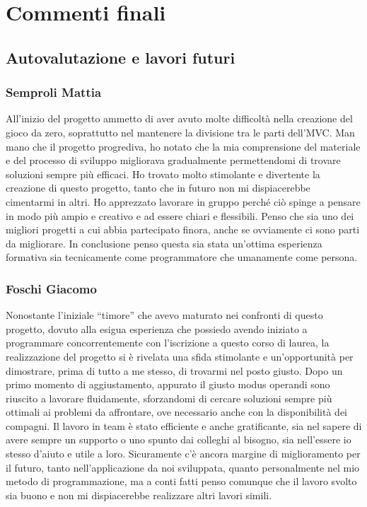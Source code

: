 \documentclass[a4paper,12pt]{report}
\begin{document}
\chapter{Commenti finali}

\section{Autovalutazione e lavori futuri}

\subsection*{Semproli Mattia}
All’inizio del progetto ammetto di aver avuto molte difficoltà nella creazione del gioco da zero, soprattutto nel mantenere la divisione tra le parti dell'MVC. Man mano che il progetto progrediva, ho notato che la mia comprensione del materiale e del processo di sviluppo migliorava gradualmente permettendomi di trovare soluzioni sempre più efficaci. Ho trovato molto stimolante e divertente la creazione di questo progetto, tanto che in futuro non mi dispiacerebbe cimentarmi in altri. Ho apprezzato lavorare in gruppo perché ciò spinge a pensare in modo più ampio e creativo e ad essere chiari e flessibili. Penso che sia uno dei migliori progetti a cui abbia partecipato finora, anche se ovviamente ci sono parti da migliorare. In conclusione penso questa sia stata un’ottima esperienza formativa sia tecnicamente come programmatore che umanamente come persona.

\subsection*{Foschi Giacomo}
Nonostante l’iniziale “timore” che avevo maturato nei confronti di questo progetto, dovuto alla esigua esperienza che possiedo avendo iniziato a programmare concorrentemente con l’iscrizione a questo corso di laurea, la realizzazione del progetto si è rivelata una sfida stimolante e un’opportunità per dimostrare, prima di tutto a me stesso, di trovarmi nel posto giusto. Dopo un primo momento di aggiustamento, appurato il giusto modus operandi sono riuscito a lavorare fluidamente, sforzandomi di cercare soluzioni sempre più ottimali ai problemi da affrontare, ove necessario anche con la disponibilità dei compagni. Il lavoro in team è stato efficiente e anche gratificante, sia nel sapere di avere sempre un supporto o uno spunto dai colleghi al bisogno, sia nell’essere io stesso d’aiuto e utile a loro. Sicuramente c’è ancora margine di miglioramento per il futuro, tanto nell’applicazione da noi sviluppata, quanto personalmente nel mio metodo di programmazione, ma a conti fatti penso comunque che il lavoro svolto sia buono e non mi dispiacerebbe realizzare altri lavori simili.
\end{document}
